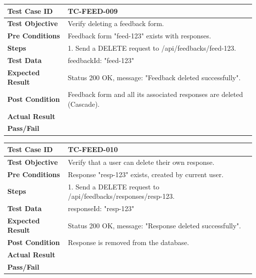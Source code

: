 \begin{longtable}{|p{}|p{}|}
\hline
\textbf{Test Case ID} & TC-FEED-009 \\ \hline
\textbf{Test Objective} & Verify deleting a feedback form. \\ \hline
\textbf{Pre Conditions} & Feedback form "feed-123" exists with responses. \\ \hline
\textbf{Steps} & 
1. Send a DELETE request to /api/feedbacks/feed-123. \\ \hline
\textbf{Test Data} & feedbackId: "feed-123" \\ \hline
\textbf{Expected Result} & Status 200 OK, message: "Feedback deleted successfully". \\ \hline
\textbf{Post Condition} & Feedback form and all its associated responses are deleted (Cascade). \\ \hline
\textbf{Actual Result} &  \\ \hline
\textbf{Pass/Fail} &  \\ \hline
\end{longtable}

\begin{longtable}{|p{}|p{}|}
\hline
\textbf{Test Case ID} & TC-FEED-010 \\ \hline
\textbf{Test Objective} & Verify that a user can delete their own response. \\ \hline
\textbf{Pre Conditions} & Response "resp-123" exists, created by current user. \\ \hline
\textbf{Steps} & 
1. Send a DELETE request to /api/feedbacks/responses/resp-123. \\ \hline
\textbf{Test Data} & responseId: "resp-123" \\ \hline
\textbf{Expected Result} & Status 200 OK, message: "Response deleted successfully". \\ \hline
\textbf{Post Condition} & Response is removed from the database. \\ \hline
\textbf{Actual Result} &  \\ \hline
\textbf{Pass/Fail} &  \\ \hline
\end{longtable}